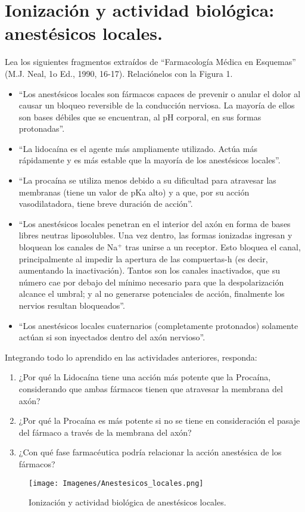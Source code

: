 \documentclass[12pt,a4paper]{article}
\begin{document}
\section{Ionización y actividad biológica: anestésicos locales.}

Lea los siguientes fragmentos extraídos de “Farmacología Médica en Esquemas” (M.J. Neal, 1o Ed., 1990, 16-17). Relaciónelos con la Figura 1.

\begin{itemize}
	\item “Los anestésicos locales son fármacos capaces de prevenir o anular el dolor al causar un bloqueo reversible de la conducción nerviosa. La mayoría de ellos son bases	débiles que se encuentran, al pH corporal, en sus formas protonadas”.
	
	\item  “La lidocaína es el agente más ampliamente utilizado. Actúa más rápidamente y es más estable que la mayoría de los anestésicos locales”.
	
	\item “La procaína se utiliza menos debido a su dificultad para atravesar las membranas	(tiene un valor de pKa alto) y a que, por su acción vasodilatadora, tiene breve duración de acción”.
	
	\item  “Los anestésicos locales penetran en el interior del axón en forma de bases libres neutras liposolubles. Una vez dentro, las formas ionizadas ingresan y bloquean los canales de Na$^+$ tras unirse a un receptor. Esto bloquea el canal, principalmente al impedir la apertura de las compuertas-h (es decir, aumentando la inactivación). Tantos son los canales inactivados, que su número cae por debajo del mínimo necesario para que la despolarización alcance el umbral; y al no generarse potenciales de acción, finalmente los nervios resultan bloqueados”.
	
	\item “Los anestésicos locales cuaternarios (completamente protonados) solamente actúan si son inyectados dentro del axón nervioso”.

\end{itemize}

Integrando todo lo aprendido en las actividades anteriores, responda:

\renewcommand{\labelenumi}{\thesection.\arabic{enumi}}

\begin{enumerate}
	\item ¿Por qué la Lidocaína tiene una acción más potente que la Procaína, considerando que ambas fármacos tienen que atravesar la membrana del axón?
	
	\item  ¿Por qué la Procaína es más potente si no se tiene en consideración el pasaje del fármaco a través de la membrana del axón?
	
	\item ¿Con qué fase farmacéutica podría relacionar la acción anestésica de los fármacos?

\end{enumerate}

\begin{figure}
	\centering
	\texttt{[image: Imagenes/Anestesicos\_locales.png]}
	\caption{Ionización y actividad biológica de anestésicos locales.}
\end{figure}
\end{document}
